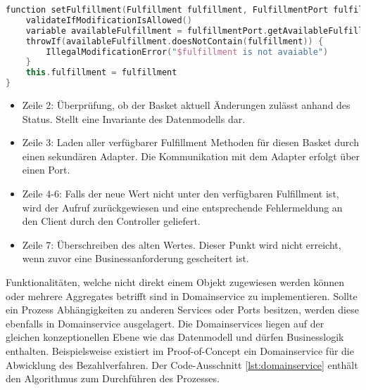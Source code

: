 
\begin{minipage}{\linewidth} %
	\begin{lstlisting}[caption={Setzen der Fulfillment Methode im Basket Aggregate}, label={lst:basket}, language=Kotlin]
function setFulfillment(Fulfillment fulfillment, FulfillmentPort fulfillmentPort) {
	validateIfModificationIsAllowed()
	variable availableFulfillment = fulfillmentPort.getAvailableFulfillment(outletId)
	throwIf(availableFulfillment.doesNotContain(fulfillment)) {
		IllegalModificationError("$fulfillment is not avaiable")
	}
	this.fulfillment = fulfillment
}
	\end{lstlisting}
\end{minipage}

\begin{itemize}[noitemsep,nolistsep]
	\item Zeile 2: Überprüfung, ob der Basket aktuell Änderungen zulässt anhand des Status. Stellt eine Invariante des Datenmodells dar.
	\item Zeile 3: Laden aller verfügbarer Fulfillment Methoden für diesen Basket durch einen sekundären Adapter. Die Kommunikation mit dem Adapter erfolgt über einen Port.
	\item Zeile 4-6: Falls der neue Wert nicht unter den verfügbaren Fulfillment ist, wird der Aufruf zurückgewiesen und eine entsprechende Fehlermeldung an den Client durch den Controller geliefert.
	\item Zeile 7: Überschreiben des alten Wertes. Dieser Punkt wird nicht erreicht, wenn zuvor eine Businessanforderung gescheitert ist.
\end{itemize}

Funktionalitäten, welche nicht direkt einem Objekt zugewiesen werden können oder mehrere Aggregates betrifft sind in Domainservice zu implementieren. Sollte ein Prozess Abhängigkeiten zu anderen Services oder Ports besitzen, werden diese ebenfalls in Domainservice ausgelagert. Die Domainservices liegen auf der gleichen konzeptionellen Ebene wie das Datenmodell und dürfen Businesslogik enthalten. Beispielsweise existiert im Proof-of-Concept ein Domainservice für die Abwicklung des Bezahlverfahren. Der Code-Ausschnitt \ref{lst:domainservice} enthält den Algorithmus zum Durchführen des Prozesses. 

